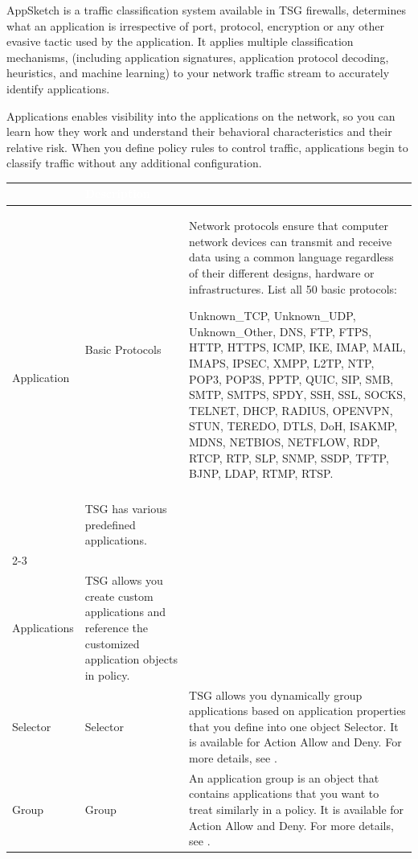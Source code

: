 AppSketch is a traffic classification system available in TSG firewalls, determines what an application is irrespective of port, protocol, 
encryption or any other evasive tactic used by the application. It applies multiple classification mechanisms, (including application signatures, 
application protocol decoding, heuristics, and machine learning) to your network traffic stream to accurately identify applications.


Applications enables visibility into the applications on the network, so you can learn how they work and understand their behavioral characteristics 
and their relative risk. When you define policy rules to control traffic, applications begin to classify traffic without any additional configuration.


\begin{longtable}{p{}|p{}|p{}}   
    \rowcolor{black}\multicolumn{2}{l!{\color{white}\vrule width 0.5pt}}{\textcolor{white}{Applications Type}}  & \textcolor{white}{Description}\\\hline                                                                                                                                                          
    \multirow{3}{*}{Application} & Basic Protocols & Network protocols ensure that computer network devices can transmit and receive data using a common language regardless of their different designs, hardware or infrastructures. 
    List all 50 basic protocols: 
    
    
    Unknown\_TCP, Unknown\_UDP, Unknown\_Other, DNS, FTP, FTPS, HTTP, HTTPS, ICMP, IKE, IMAP, MAIL, IMAPS, IPSEC, XMPP, L2TP, NTP, POP3, POP3S, PPTP, QUIC, SIP, SMB, SMTP, SMTPS, SPDY, SSH, SSL, SOCKS, TELNET, DHCP, RADIUS, OPENVPN, STUN, TEREDO, DTLS, DoH, ISAKMP, MDNS, NETBIOS, NETFLOW, RDP, RTCP, RTP, SLP, SNMP, SSDP, TFTP, BJNP, LDAP, RTMP, RTSP. 
    \\ \cline{2-3}
                                 & \tabincell{l}{Predefined\\ Applications} & TSG has various predefined applications. \\ \cline{2-3}
                                 & \tabincell{l}{Customized\\ Applications} & TSG allows you create custom applications and reference the customized application objects in policy.\\\hline
    Selector & Selector & TSG allows you dynamically group applications based on application properties that you define into one object Selector. It is available for Action Allow and Deny. For more details, see \hyperlink{link:Application Selector}{\color{linkblue}{Application Selector}}.    \\ \hline 
    Group & Group & An application group is an object that contains applications that you want to treat similarly in a policy. It is available for Action Allow and Deny. For more details, see \hyperlink{link:Application Group}{\color{linkblue}{Application Group}}.    \\ \hline                                                                                                 
\end{longtable}


